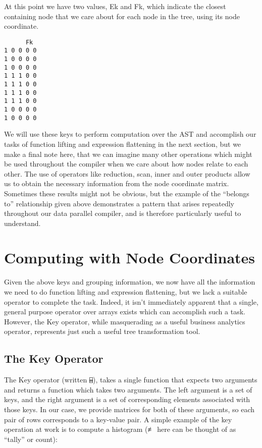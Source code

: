 \documentclass[pldi]{sigplanconf-pldi15}
\begin{document}
At this point we have two values, Ek and Fk, which indicate the closest containing node that we care about 
for each node in the tree, using its node coordinate. 

\begin{verbatim}
      Fk
1 0 0 0 0
1 0 0 0 0
1 0 0 0 0
1 1 1 0 0
1 1 1 0 0
1 1 1 0 0
1 1 1 0 0
1 0 0 0 0
1 0 0 0 0
\end{verbatim}

We will use these keys to perform computation over the AST and accomplish our tasks of function lifting and 
expression flattening in the next section, but we make a final note here, that we can imagine many other 
operations which might be used throughout the compiler when we care about how nodes relate to each 
other. The use of operators like reduction, scan, inner and outer products allow us to obtain the necessary 
information from the node coordinate matrix. Sometimes these results might not be obvious, but the 
example of the “belongs to” relationship given above demonstrates a pattern that arises repeatedly 
throughout our data parallel compiler, and is therefore particularly useful to understand. 
\section{Computing with Node Coordinates}

Given the above keys and grouping information, we now have all the information we need to do 
function lifting and expression flattening, but we lack a suitable operator to complete the task. 
Indeed, it isn’t immediately apparent that a single, general purpose operator over arrays exists 
which can accomplish such a task. However, the Key operator, while masquerading as a useful business 
analytics operator, represents just such a useful tree transformation tool. 

\subsection{The Key Operator}

The Key operator (written \verb;⌸;), takes a single function that expects two arguments and returns 
a function which takes two arguments. The left argument is a set of keys, and the right argument 
is a set of corresponding elements associated with those keys. In our case, we provide matrices 
for both of these arguments, so each pair of rows corresponds to a key-value pair. A simple example 
of the key operation at work is to compute a histogram (≢ here can be thought of as “tally” or count):
\end{document}
